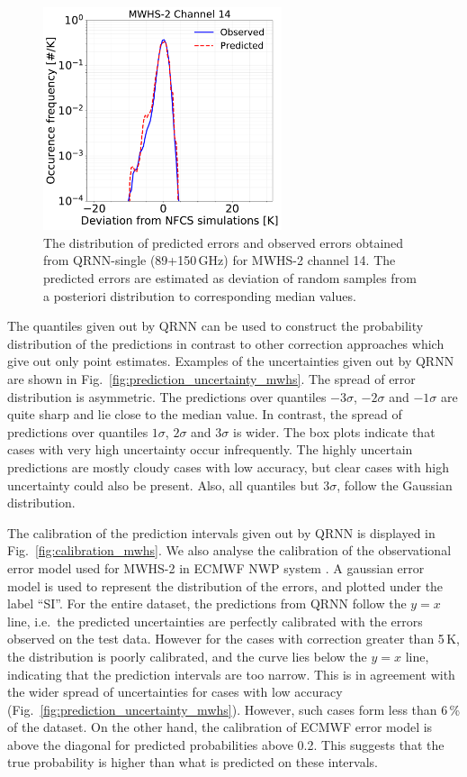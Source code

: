 \documentclass[amt, manuscript]{copernicus}
\begin{document}
\begin{figure}[t]
	\includegraphics[width=70mm]{Figures/fig07.pdf}	
	\caption{The distribution of predicted errors and observed errors  obtained from QRNN-single (89+150\,GHz) for MWHS-2 channel 14. The predicted errors are estimated as deviation of random samples from a posteriori distribution to corresponding median values.}
	\label{fig:predicted_errors_mwhs}	
\end{figure}

The quantiles given out by QRNN can be used to construct the probability distribution of the predictions in contrast to other correction approaches which give out only point estimates. Examples of the uncertainties given out by QRNN are shown in Fig.~\ref{fig:prediction_uncertainty_mwhs}. The spread of error distribution is asymmetric. The predictions over quantiles $-3\sigma$, $-2\sigma$ and $-1\sigma$ are quite sharp and lie close to the median value. In contrast, the spread of predictions over quantiles $1\sigma$, $2\sigma$ and $3\sigma$ is wider. The box plots indicate that cases with very high uncertainty occur infrequently. The highly uncertain predictions are mostly cloudy cases with low accuracy, but clear cases with high uncertainty could also be present. Also, all quantiles but  $3\sigma$, follow the Gaussian distribution.  

The calibration of the prediction intervals given out by QRNN is displayed in Fig.~\ref{fig:calibration_mwhs}. We also analyse the calibration of the observational error model used for MWHS-2 in ECMWF NWP system \citep{lawrence2018FY3C}. A gaussian error model is used to represent the distribution of the errors, and plotted under the label ``SI''. For the entire dataset, the predictions from QRNN follow the $y=x$ line, i.e.\ the predicted uncertainties are perfectly calibrated with the errors observed on the test data. However for the cases with correction greater than 5\,K, the distribution is poorly calibrated, and the curve lies below the $y =x$ line, indicating that the prediction intervals are too narrow. This is in agreement with the wider spread of uncertainties for cases with low accuracy (Fig.~\ref{fig:prediction_uncertainty_mwhs}). However, such cases form less than 6\,\% of the dataset. On the other hand, the calibration of ECMWF error model is above the diagonal for predicted probabilities above 0.2. This suggests that the true probability is higher than what is predicted on these intervals. 
\end{document}
